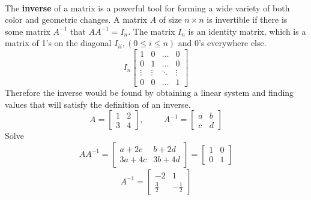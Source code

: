 \documentclass[11pt]{article}
\begin{document}
\paragraph[Inverse]{} The \textbf{inverse} of a matrix is a powerful tool for forming a wide variety of both color and geometric changes. A matrix $A$ of size $n\times n$ is invertible if there is some matrix $A^{-1}$ that $AA^{-1}=I_{n}$. The matrix $I_{n}$ is an identity matrix, which is a matrix of 1's on the diagonal $I_{ii}, (0 \leq i \leq n)$ and 0's everywhere else.
{ \small
	\begin{equation}\label{equ:IdentityMatrix}
	I_{n}
	\begin{bmatrix}
	1 		& 0 	& \dots	 & 0 \\
	0 		& 1 	& \dots	 & 0 \\
	\vdots 	& \vdots& \ddots & \vdots \\
	0		& 0		& \dots  & 1
	\end{bmatrix}
	\end{equation}
}
Therefore the inverse would be found by obtaining a linear system and finding values that will satisfy the definition of an inverse.
{ \small
	\begin{equation}\label{equ:InverseMatrix}
	A=
	\begin{bmatrix}
	1 & 2\\
	3 & 4 
	\end{bmatrix}
	,\hspace{1cm}
	A^{-1}=
	\begin{bmatrix}
	a & b\\
	c & d 
	\end{bmatrix}
	\end{equation}
}
Solve
{ \small
	\begin{equation}\label{equ:InverseMatrixSolved}
	AA^{-1}=
	\begin{bmatrix}
	a+2c & b+2d\\
	3a+4c & 3b+4d
	\end{bmatrix}
	=
	\begin{bmatrix}
	1 & 0\\
	0 & 1 
	\end{bmatrix}
	\end{equation}
	\begin{align*}
	A^{-1}=
	\begin{bmatrix}
	-2 & 1\\
	\frac{3}{2} & -\frac{1}{2}
	\end{bmatrix}
	\end{align*}
}
\end{document}
